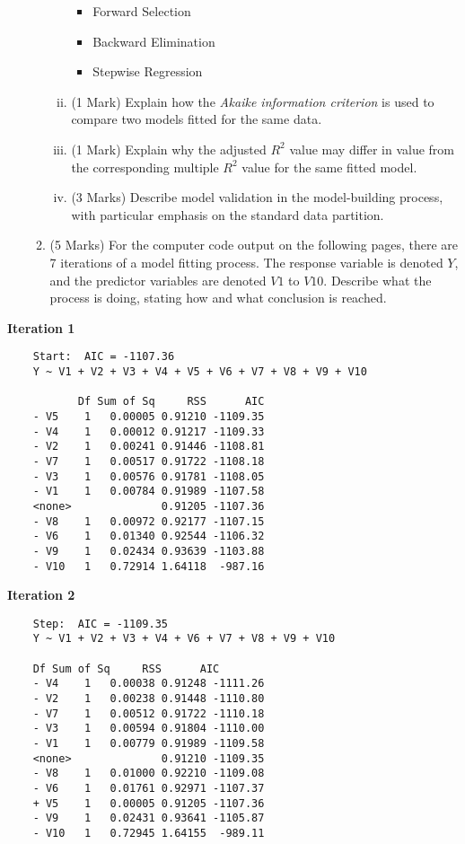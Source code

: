 \documentclass[a4paper,12pt]{article}
\begin{document}
\begin{enumerate}
\begin{enumerate}
\begin{enumerate}[(i)]
\begin{itemize}
		\item Forward Selection
		\item Backward Elimination
		\item Stepwise Regression
	\end{itemize}


	\item (1 Mark)  Explain how the \emph{Akaike information criterion} is used to compare two models fitted for the same data.

\item (1 Mark) Explain why the adjusted $R^2$ value may differ in value from the corresponding multiple $R^2$ value for the same fitted model.

	\item (3 Marks) Describe model validation in the model-building process, with particular emphasis on the standard data partition.
\end{enumerate}
\item (5 Marks) For the computer code output on the following pages, there are 7 iterations of a model fitting process. The response variable is denoted $Y$, and the predictor variables are denoted $V1$ to $V10$. Describe what the process is doing, stating how and what conclusion is reached. 
\end{enumerate}


\end{enumerate}


\noindent \textbf{Iteration 1}
\begin{framed}
	\begin{verbatim}
	Start:  AIC = -1107.36
	Y ~ V1 + V2 + V3 + V4 + V5 + V6 + V7 + V8 + V9 + V10
	
	       Df Sum of Sq     RSS      AIC
	- V5    1   0.00005 0.91210 -1109.35
	- V4    1   0.00012 0.91217 -1109.33
	- V2    1   0.00241 0.91446 -1108.81
	- V7    1   0.00517 0.91722 -1108.18
	- V3    1   0.00576 0.91781 -1108.05
	- V1    1   0.00784 0.91989 -1107.58
	<none>              0.91205 -1107.36
	- V8    1   0.00972 0.92177 -1107.15
	- V6    1   0.01340 0.92544 -1106.32
	- V9    1   0.02434 0.93639 -1103.88
	- V10   1   0.72914 1.64118  -987.16
	\end{verbatim}
\end{framed}
\newpage
\noindent \textbf{Iteration 2}
\begin{framed}
	\begin{verbatim}
	Step:  AIC = -1109.35
	Y ~ V1 + V2 + V3 + V4 + V6 + V7 + V8 + V9 + V10
	
	Df Sum of Sq     RSS      AIC
	- V4    1   0.00038 0.91248 -1111.26
	- V2    1   0.00238 0.91448 -1110.80
	- V7    1   0.00512 0.91722 -1110.18
	- V3    1   0.00594 0.91804 -1110.00
	- V1    1   0.00779 0.91989 -1109.58
	<none>              0.91210 -1109.35
	- V8    1   0.01000 0.92210 -1109.08
	- V6    1   0.01761 0.92971 -1107.37
	+ V5    1   0.00005 0.91205 -1107.36
	- V9    1   0.02431 0.93641 -1105.87
	- V10   1   0.72945 1.64155  -989.11
	\end{verbatim}
\end{framed}
\end{document}
